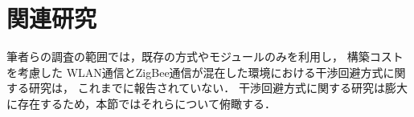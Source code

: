 \documentclass[technicalreport]{ieicej}
\begin{document}



\section{関連研究}
\label{sec:wlan_and_zigbee}

筆者らの調査の範囲では，既存の方式やモジュールのみを利用し，
構築コストを考慮した
WLAN通信とZigBee通信が混在した環境における干渉回避方式に関する研究は，
これまでに報告されていない．
干渉回避方式に関する研究は膨大に存在するため，本節ではそれらについて俯瞰する．
\end{document}
